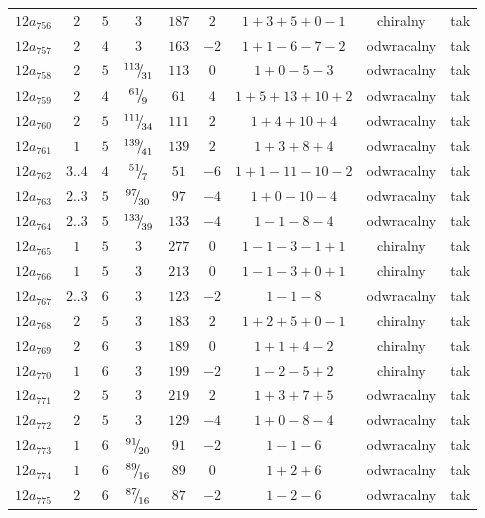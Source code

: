 \begin{longtable}{ccccccccc}
$12a_{756}$ & $2$ & $5$ & $3$ & $187$ & $2$ & $1+3+5+0-1$ & chiralny & tak \\
$12a_{757}$ & $2$ & $4$ & $3$ & $163$ & $-2$ & $1+1-6-7-2$ & odwracalny & tak \\
$12a_{758}$ & $2$ & $5$ & ${}^{113}{\mskip -5mu/\mskip -3mu}_{31}$ & $113$ & $0$ & $1+0-5-3$ & odwracalny & tak \\
$12a_{759}$ & $2$ & $4$ & ${}^{61}{\mskip -5mu/\mskip -3mu}_{9}$ & $61$ & $4$ & $1+5+13+10+2$ & odwracalny & tak \\
$12a_{760}$ & $2$ & $5$ & ${}^{111}{\mskip -5mu/\mskip -3mu}_{34}$ & $111$ & $2$ & $1+4+10+4$ & odwracalny & tak \\
$12a_{761}$ & $1$ & $5$ & ${}^{139}{\mskip -5mu/\mskip -3mu}_{41}$ & $139$ & $2$ & $1+3+8+4$ & odwracalny & tak \\
$12a_{762}$ & $3..4$ & $4$ & ${}^{51}{\mskip -5mu/\mskip -3mu}_{7}$ & $51$ & $-6$ & $1+1-11-10-2$ & odwracalny & tak \\
$12a_{763}$ & $2..3$ & $5$ & ${}^{97}{\mskip -5mu/\mskip -3mu}_{30}$ & $97$ & $-4$ & $1+0-10-4$ & odwracalny & tak \\
$12a_{764}$ & $2..3$ & $5$ & ${}^{133}{\mskip -5mu/\mskip -3mu}_{39}$ & $133$ & $-4$ & $1-1-8-4$ & odwracalny & tak \\
$12a_{765}$ & $1$ & $5$ & $3$ & $277$ & $0$ & $1-1-3-1+1$ & chiralny & tak \\
$12a_{766}$ & $1$ & $5$ & $3$ & $213$ & $0$ & $1-1-3+0+1$ & chiralny & tak \\
$12a_{767}$ & $2..3$ & $6$ & $3$ & $123$ & $-2$ & $1-1-8$ & odwracalny & tak \\
$12a_{768}$ & $2$ & $5$ & $3$ & $183$ & $2$ & $1+2+5+0-1$ & chiralny & tak \\
$12a_{769}$ & $2$ & $6$ & $3$ & $189$ & $0$ & $1+1+4-2$ & chiralny & tak \\
$12a_{770}$ & $1$ & $6$ & $3$ & $199$ & $-2$ & $1-2-5+2$ & chiralny & tak \\
$12a_{771}$ & $2$ & $5$ & $3$ & $219$ & $2$ & $1+3+7+5$ & odwracalny & tak \\
$12a_{772}$ & $2$ & $5$ & $3$ & $129$ & $-4$ & $1+0-8-4$ & odwracalny & tak \\
$12a_{773}$ & $1$ & $6$ & ${}^{91}{\mskip -5mu/\mskip -3mu}_{20}$ & $91$ & $-2$ & $1-1-6$ & odwracalny & tak \\
$12a_{774}$ & $1$ & $6$ & ${}^{89}{\mskip -5mu/\mskip -3mu}_{16}$ & $89$ & $0$ & $1+2+6$ & odwracalny & tak \\
$12a_{775}$ & $2$ & $6$ & ${}^{87}{\mskip -5mu/\mskip -3mu}_{16}$ & $87$ & $-2$ & $1-2-6$ & odwracalny & tak \\

\end{longtable}
